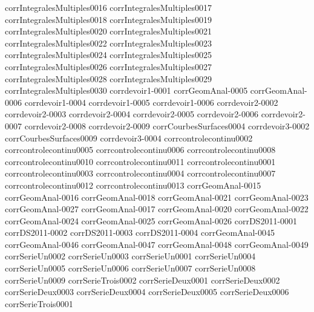 {corrIntegralesMultiples0016}
{corrIntegralesMultiples0017}
{corrIntegralesMultiples0018}
{corrIntegralesMultiples0019}
{corrIntegralesMultiples0020}
{corrIntegralesMultiples0021}
{corrIntegralesMultiples0022}
{corrIntegralesMultiples0023}
{corrIntegralesMultiples0024}
{corrIntegralesMultiples0025}
{corrIntegralesMultiples0026}
{corrIntegralesMultiples0027}
{corrIntegralesMultiples0028}
{corrIntegralesMultiples0029}
{corrIntegralesMultiples0030}
{corrdevoir1-0001}
{corrGeomAnal-0005}
{corrGeomAnal-0006}
{corrdevoir1-0004}
{corrdevoir1-0005}
{corrdevoir1-0006}
{corrdevoir2-0002}
{corrdevoir2-0003}
{corrdevoir2-0004}
{corrdevoir2-0005}
{corrdevoir2-0006}
{corrdevoir2-0007}
{corrdevoir2-0008}
{corrdevoir2-0009}
{corrCourbesSurfaces0004}
{corrdevoir3-0002}
{corrCourbesSurfaces0009}
{corrdevoir3-0004}
{corrcontrolecontinu0002}
{corrcontrolecontinu0005}
{corrcontrolecontinu0006}
{corrcontrolecontinu0008}
{corrcontrolecontinu0010}
{corrcontrolecontinu0011}
{corrcontrolecontinu0001}
{corrcontrolecontinu0003}
{corrcontrolecontinu0004}
{corrcontrolecontinu0007}
{corrcontrolecontinu0012}
{corrcontrolecontinu0013}
{corrGeomAnal-0015}
{corrGeomAnal-0016}
{corrGeomAnal-0018}
{corrGeomAnal-0021}
{corrGeomAnal-0023}
{corrGeomAnal-0027}
{corrGeomAnal-0017}
{corrGeomAnal-0020}
{corrGeomAnal-0022}
{corrGeomAnal-0024}
{corrGeomAnal-0025}
{corrGeomAnal-0026}
{corrDS2011-0001}
{corrDS2011-0002}
{corrDS2011-0003}
{corrDS2011-0004}
{corrGeomAnal-0045}
{corrGeomAnal-0046}
{corrGeomAnal-0047}
{corrGeomAnal-0048}
{corrGeomAnal-0049}
{corrSerieUn0002}
{corrSerieUn0003}
{corrSerieUn0001}
{corrSerieUn0004}
{corrSerieUn0005}
{corrSerieUn0006}
{corrSerieUn0007}
{corrSerieUn0008}
{corrSerieUn0009}
{corrSerieTrois0002}
{corrSerieDeux0001}
{corrSerieDeux0002}
{corrSerieDeux0003}
{corrSerieDeux0004}
{corrSerieDeux0005}
{corrSerieDeux0006}
{corrSerieTrois0001}
